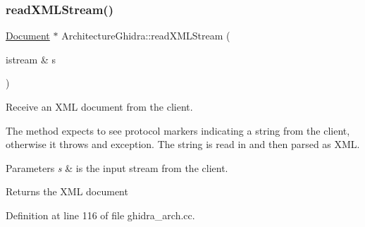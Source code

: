 \subsubsection{\texorpdfstring{readXMLStream()}{readXMLStream()}}
{\footnotesize\ttfamily \mbox{\hyperlink{class_document}{Document}} $\ast$ Architecture\+Ghidra\+::read\+X\+M\+L\+Stream (\begin{DoxyParamCaption}\item[{istream \&}]{s }\end{DoxyParamCaption})\hspace{0.3cm}{\ttfamily [static]}}



Receive an X\+ML document from the client. 

The method expects to see protocol markers indicating a string from the client, otherwise it throws and exception. The string is read in and then parsed as X\+ML. 
\begin{DoxyParams}{Parameters}
{\em s} & is the input stream from the client. \\
\hline
\end{DoxyParams}
\begin{DoxyReturn}{Returns}
the X\+ML document 
\end{DoxyReturn}


Definition at line 116 of file ghidra\+\_\+arch.\+cc.

